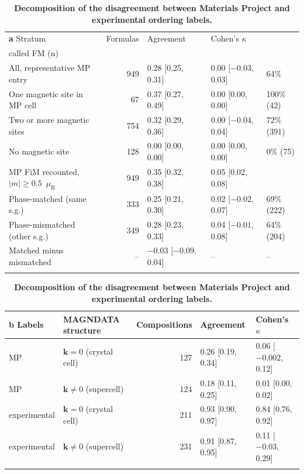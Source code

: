 \documentclass[pdflatex,sn-nature]{sn-jnl}
\makeatletter
\newcommand{\muB}{\ensuremath{\mu_\mathrm{B}}}
\newcommand{\ci}[2]{[#1, #2]}
\newcommand{\hd}[1]{\begin{tabular}[b]{@{}c@{}}#1\end{tabular}}
\makeatother
\begin{document}
\begin{table}[!ht]
\caption{\textbf{Decomposition of the disagreement between Materials Project and experimental ordering labels.}}\label{tab:s25}%
\setlength{\tabcolsep}{3pt}%
\begin{tabular*}{\textwidth}{@{\extracolsep\fill}lrlll@{}}
\toprule
\textbf{a} Stratum & Formulas & Agreement & Cohen's $\kappa$ & \hd{Exp.\ AFM\\called FM (n)} \\
\midrule
All, representative MP entry & 949 & 0.28 \ci{0.25}{0.31} & 0.00 \ci{$-0.03$}{0.03} & 64\% \\
One magnetic site in MP cell & 67 & 0.37 \ci{0.27}{0.49} & 0.00 \ci{0.00}{0.00} & 100\% (42) \\
Two or more magnetic sites & 754 & 0.32 \ci{0.29}{0.36} & 0.00 \ci{$-0.04$}{0.04} & 72\% (391) \\
No magnetic site & 128 & 0.00 \ci{0.00}{0.00} & 0.00 \ci{0.00}{0.00} & 0\% (75) \\
MP FiM recounted, $|m|\ge0.5$~\muB{} & 949 & 0.35 \ci{0.32}{0.38} & 0.05 \ci{0.02}{0.08} &  \\
Phase-matched (same s.g.) & 333 & 0.25 \ci{0.21}{0.30} & 0.02 \ci{$-0.02$}{0.07} & 69\% (222) \\
Phase-mismatched (other s.g.) & 349 & 0.28 \ci{0.23}{0.33} & 0.04 \ci{$-0.01$}{0.08} & 64\% (204) \\
Matched minus mismatched & -- & $-0.03$ \ci{$-0.09$}{0.04} & -- & -- \\
\botrule
\end{tabular*}

\vspace{6pt}
\begin{tabular*}{\textwidth}{@{\extracolsep\fill}llrll@{}}
\toprule
\textbf{b} Labels & MAGNDATA structure & Compositions & Agreement & Cohen's $\kappa$ \\
\midrule
MP & $\mathbf{k}=0$ (crystal cell) & 127 & 0.26 \ci{0.19}{0.34} & 0.06 \ci{$-0.002$}{0.12} \\
MP & $\mathbf{k}\neq0$ (supercell) & 124 & 0.18 \ci{0.11}{0.25} & 0.01 \ci{0.00}{0.02} \\
experimental & $\mathbf{k}=0$ (crystal cell) & 211 & 0.93 \ci{0.90}{0.97} & 0.84 \ci{0.76}{0.92} \\
experimental & $\mathbf{k}\neq0$ (supercell) & 231 & 0.91 \ci{0.87}{0.95} & 0.11 \ci{$-0.03$}{0.29} \\
\botrule
\end{tabular*}


\end{table}
\end{document}
